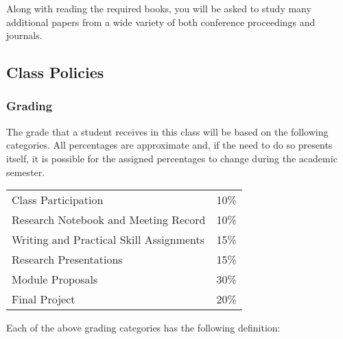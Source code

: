 Along with reading the required books, you will be asked to study many additional papers from a wide variety of both
conference proceedings and journals.

\subsection*{Class Policies}

\subsubsection*{Grading}

The grade that a student receives in this class will be based on the following categories. All percentages are
approximate and, if the need to do so presents itself, it is possible for the assigned percentages to change during the
academic semester.


\begin{center}
\begin{tabular}{ll}
Class Participation&10\%\\
Research Notebook and Meeting Record&10\%\\
Writing and Practical Skill Assignments&15\%\\
Research Presentations&15\%\\
Module Proposals&30\%\\
Final Project&20\%
\end{tabular}
\end{center}

Each of the above grading categories has the following definition:

